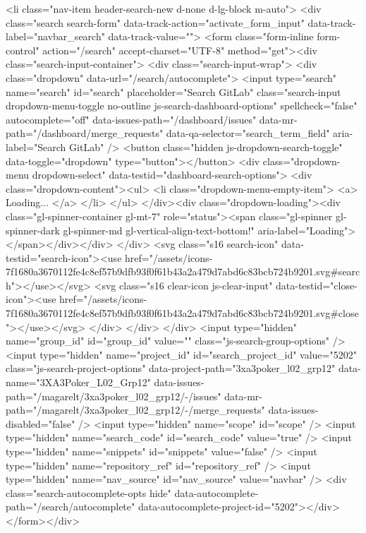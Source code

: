 {{<li class="nav-item header-search-new d-none d-lg-block m-auto">
<div class="search search-form" data-track-action="activate_form_input" data-track-label="navbar_search" data-track-value="">
<form class="form-inline form-control" action="/search" accept-charset="UTF-8" method="get"><div class="search-input-container">
<div class="search-input-wrap">
<div class="dropdown" data-url="/search/autocomplete">
<input type="search" name="search" id="search" placeholder="Search GitLab" class="search-input dropdown-menu-toggle no-outline js-search-dashboard-options" spellcheck="false" autocomplete="off" data-issues-path="/dashboard/issues" data-mr-path="/dashboard/merge_requests" data-qa-selector="search_term_field" aria-label="Search GitLab" />
<button class="hidden js-dropdown-search-toggle" data-toggle="dropdown" type="button"></button>
<div class="dropdown-menu dropdown-select" data-testid="dashboard-search-options">
<div class="dropdown-content"><ul>
<li class="dropdown-menu-empty-item">
<a>
Loading...
</a>
</li>
</ul>
</div><div class="dropdown-loading"><div class="gl-spinner-container gl-mt-7" role="status"><span class="gl-spinner gl-spinner-dark gl-spinner-md gl-vertical-align-text-bottom!" aria-label="Loading"></span></div></div>
</div>
<svg class="s16 search-icon" data-testid="search-icon"><use href="/assets/icons-7f1680a3670112fe4c8ef57b9dfb93f0f61b43a2a479d7abd6c83bcb724b9201.svg#search"></use></svg>
<svg class="s16 clear-icon js-clear-input" data-testid="close-icon"><use href="/assets/icons-7f1680a3670112fe4c8ef57b9dfb93f0f61b43a2a479d7abd6c83bcb724b9201.svg#close"></use></svg>
</div>
</div>
</div>
<input type="hidden" name="group_id" id="group_id" value="" class="js-search-group-options" />
<input type="hidden" name="project_id" id="search_project_id" value="5202" class="js-search-project-options" data-project-path="3xa3poker_l02_grp12" data-name="3XA3Poker_L02_Grp12" data-issues-path="/magarelt/3xa3poker_l02_grp12/-/issues" data-mr-path="/magarelt/3xa3poker_l02_grp12/-/merge_requests" data-issues-disabled="false" />
<input type="hidden" name="scope" id="scope" />
<input type="hidden" name="search_code" id="search_code" value="true" />
<input type="hidden" name="snippets" id="snippets" value="false" />
<input type="hidden" name="repository_ref" id="repository_ref" />
<input type="hidden" name="nav_source" id="nav_source" value="navbar" />
<div class="search-autocomplete-opts hide" data-autocomplete-path="/search/autocomplete" data-autocomplete-project-id="5202"></div>
</form></div>

}}
